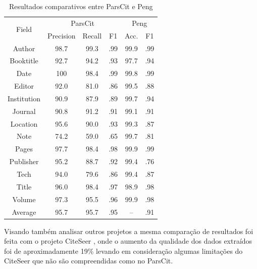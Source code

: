\begin{table}
    \caption{Resultados comparativos entre ParsCit e Peng \cite{Peng-CRF-IE}}
    \begin{center}
        \begin{tabular}{|c|c|c|c|c|c|}
            \hline 
            \multirow{2}{*}{Field} & \multicolumn{3}{c|}{ParsCit} & \multicolumn{2}{c|}{Peng} \\
            \cline{2-6}
             & Precision & Recall & F1 & Acc. & F1 \\ 
            \hline
            Author & 98.7 & 99.3 & .99 & 99.9 & .99 \\
            Booktitle & 92.7 & 94.2 & .93 & 97.7 & .94 \\
            Date & 100 & 98.4 & .99 & 99.8 & .99 \\
            Editor & 92.0 & 81.0 & .86 & 99.5 & .88 \\
            Institution & 90.9 & 87.9 & .89 & 99.7 & .94 \\
            Journal & 90.8 & 91.2 & .91 & 99.1 & .91 \\
            Location & 95.6 & 90.0 & .93 & 99.3 & .87 \\
            Note & 74.2 & 59.0 & .65 & 99.7 & .81 \\
            Pages & 97.7 & 98.4 & .98 & 99.9 & .99  \\
            Publisher & 95.2 & 88.7 & .92 & 99.4 & .76 \\
            Tech & 94.0 & 79.6 & .86 & 99.4 & .87 \\
            Title & 96.0 & 98.4 & .97 & 98.9 & .98 \\
            Volume & 97.3 & 95.5 & .96 & 99.9 & .98 \\
            \hline
            Average & 95.7 & 95.7 & .95 & – & .91 \\
            \hline
        \end{tabular}
    \end{center}
    \label{tab:parscit-results}
\end{table}

Visando também analisar outros projetos a mesma comparação de resultados foi feita com o projeto CiteSeer \cite{citeseer}, onde o aumento da qualidade dos dados extraídos foi de aproximadamente 19\% levando em consideração algumas limitações do CiteSeer que não são compreendidas como no ParsCit.


